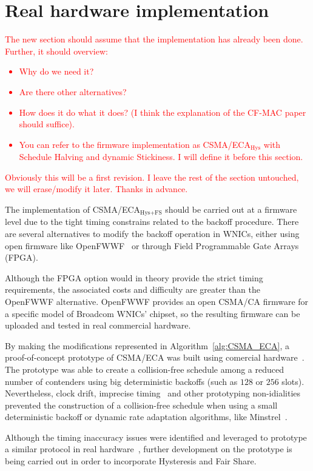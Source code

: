 \section{Real hardware implementation}\label{EDCA}

\textcolor{red}{The new section should assume that the implementation has already been done. Further, it should overview:}

\textcolor{red}{\begin{itemize}
	\item Why do we need it?
	\item Are there other alternatives?
	\item How does it do what it does? (I think the explanation of the CF-MAC paper should suffice).
	\item You can refer to the firmware implementation as CSMA/ECA$_{\text{Hys}}$ with Schedule Halving and dynamic Stickiness. I will define it before this section.
\end{itemize}}

\textcolor{red}{Obviously this will be a first revision. I leave the rest of the section untouched, we will erase/modify it later. Thanks in advance.}

The implementation of CSMA/ECA$_{\text{Hys+FS}}$ should be carried out at a firmware level due to the tight timing constrains related to the backoff procedure. There are several alternatives to modify the backoff operation in WNICs, either using open firmware like OpenFWWF~\cite{OpenFWWF} or through Field Programmable Gate Arrays (FPGA).

Although the FPGA option would in theory provide the strict timing requirements, the associated costs and difficulty are greater than the OpenFWWF alternative. OpenFWWF provides an open CSMA/CA firmware for a specific model of Broadcom WNICs' chipset, so the resulting firmware can be uploaded and tested in real commercial hardware. 

By making the modifications represented in Algorithm~\ref{alg:CSMA_ECA}, a proof-of-concept prototype of CSMA/ECA was built using comercial hardware~\cite{ECA-DEMO-INFOCOM14, sanabria2013prototyping, BECA-test}. The prototype was able to create a collision-free schedule among a reduced number of contenders using big deterministic backoffs (such as $128$ or $256$ slots). Nevertheless, clock drift, imprecise timing~\cite{bianchi2007experimental} and other prototyping non-idialities prevented the construction of a collision-free schedule when using a small deterministic backoff or dynamic rate adaptation algorithms, like Minstrel~\cite{minstrel}.

Although the timing inaccuracy issues were identified and leveraged to prototype a similar protocol in real hardware~\cite{CF-MAC}, further development on the prototype is being carried out in order to incorporate Hysteresis and Fair Share.